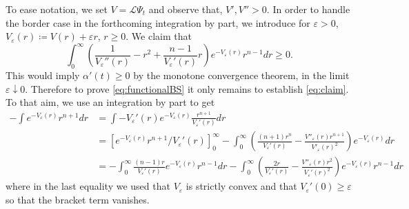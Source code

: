 \documentclass[11pt]{article}
\newcommand{\1}{[1]}
\begin{document}
To ease notation, we set   $V=\mathcal{L}\Psi_t$ and observe that, $V',V''>0$. In order to handle the border case in the forthcoming integration by part, we introduce for $\varepsilon >0$,
$V_\varepsilon(r) \coloneqq V(r) + \varepsilon r$, $r \geq 0$. We claim that
\begin{equation} \label{eq:claim}
\int_0^\infty  \left( \frac{1}{V_\varepsilon''(r)} - r^2 + \frac{n-1}{V_\varepsilon'(r)}r \right) e^{-V_\varepsilon(r)}r^{n-1}dr     \geq 0 .
\end{equation}
This would imply $\alpha'(t) \geq 0$ by the monotone convergence theorem, in the limit $\varepsilon \downarrow 0$. Therefore to prove \eqref{eq:functionalBS} it only remains to establish \eqref{eq:claim}. To that aim, we use an integration by part to get 
\begin{align*}
-\int e^{-V_\varepsilon(r)}r^{n+1}dr
& =
\int -V_\varepsilon'(r)e^{-V_\varepsilon(r)} \frac{r^{n+1}}{V_\varepsilon'(r)}dr \\
& =
\left[ e^{-V_\varepsilon(r)}r^{n+1}/V_\varepsilon'(r)\right]_0^\infty 
- \int_0^\infty \left(
\frac{(n+1)r^n}{V_\varepsilon'(r)} - \frac{V''_\varepsilon(r)r^{n+1}}{V'_\varepsilon(r)^2} \right)
e^{-V_\varepsilon(r)} dr\\
& =
- \int_0^\infty 
\frac{(n-1)r}{V_\varepsilon'(r)} e^{-V_\varepsilon(r)} r^{n-1}dr
- \int_0^\infty \left(
\frac{2r}{V_\varepsilon'(r)} - \frac{V''_\varepsilon(r)r^2}{V_\varepsilon'(r)^2} \right)
e^{-V_\varepsilon(r)} r^{n-1}dr 
\end{align*}
where in the last equality we used that $V_\varepsilon$ is strictly convex and that $V_\varepsilon'(0) \geq \varepsilon$ so that the bracket term vanishes.
\end{document}
